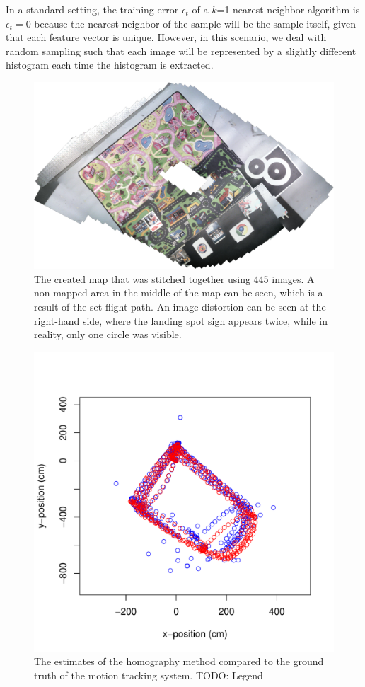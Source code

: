 \documentclass{report}
\begin{document}
In a standard setting, the training error $\epsilon_t$ of a
$k$=1-nearest neighbor algorithm is $\epsilon_t = 0$ because the
nearest neighbor of the sample will be the sample itself, given that
each feature vector is unique. However, in this scenario, we deal with
random sampling such that each image will be represented by a slightly
different histogram each time the histogram is extracted.

\begin{figure}[h!]
\begin{center}
\includegraphics[width=0.7\columnwidth]{map_rotated}
\caption{{\label{fig:mapexp} The created map that was stitched
    together using 445 images. A non-mapped area in the middle of the
    map can be seen, which is a result of the set flight path. An
    image distortion can be seen at the right-hand side, where the
    landing spot sign appears twice, while in reality, only one circle
    was visible.%
  }}
\end{center}
\end{figure}

\begin{figure}[h!]
\begin{center}
\includegraphics[width=0.448\columnwidth]{SIFT_vs_OptiTrack}
\caption{{\label{fig:flightpath} The estimates of the homography
    method compared to the ground truth of the motion tracking system.
    TODO: Legend%
  }}
\end{center}
\end{figure}
\end{document}

